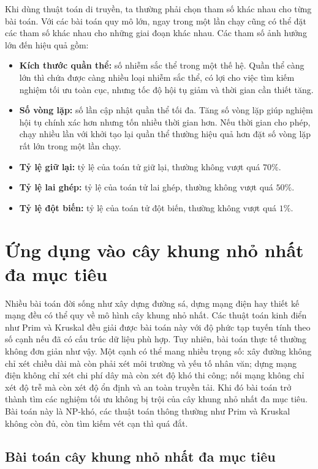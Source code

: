 \documentclass[11pt]{article}
\begin{document}
Khi dùng thuật toán di truyền, ta thường phải chọn tham số khác nhau cho từng
bài toán. Với các bài toán quy mô lớn, ngay trong một lần chạy cũng có thể đặt
các tham số khác nhau cho những giai đoạn khác nhau. Các tham số ảnh hưởng lớn
đến hiệu quả gồm:
\begin{itemize}
  \item \textbf{Kích thước quần thể:} số nhiễm sắc thể trong một thế hệ. Quần
  thể càng lớn thì chứa được càng nhiều loại nhiễm sắc thể, có lợi cho việc
  tìm kiếm nghiệm tối ưu toàn cục, nhưng tốc độ hội tụ giảm và thời gian cần
  thiết tăng.
  \item \textbf{Số vòng lặp:} số lần cập nhật quần thể tối đa. Tăng số vòng
  lặp giúp nghiệm hội tụ chính xác hơn nhưng tốn nhiều thời gian hơn. Nếu thời
  gian cho phép, chạy nhiều lần với khởi tạo lại quần thể thường hiệu quả hơn
  đặt số vòng lặp rất lớn trong một lần chạy.
  \item \textbf{Tỷ lệ giữ lại:} tỷ lệ của toán tử giữ lại, thường không vượt
  quá \(70\%\).
  \item \textbf{Tỷ lệ lai ghép:} tỷ lệ của toán tử lai ghép, thường không vượt
  quá \(50\%\).
  \item \textbf{Tỷ lệ đột biến:} tỷ lệ của toán tử đột biến, thường không vượt
  quá \(1\%\).
\end{itemize}

\section{Ứng dụng vào cây khung nhỏ nhất đa mục tiêu}

Nhiều bài toán đời sống như xây dựng đường sá, dựng mạng điện hay thiết kế
mạng đều có thể quy về mô hình cây khung nhỏ nhất. Các thuật toán kinh điển
như Prim và Kruskal đều giải được bài toán này với độ phức tạp tuyến tính theo
số cạnh nếu đã có cấu trúc dữ liệu phù hợp. Tuy nhiên, bài toán thực tế thường
không đơn giản như vậy. Một cạnh có thể mang nhiều trọng số: xây đường không
chỉ xét chiều dài mà còn phải xét môi trường và yếu tố nhân văn; dựng mạng
điện không chỉ xét chi phí dây mà còn xét độ khó thi công; nối mạng không chỉ
xét độ trễ mà còn xét độ ổn định và an toàn truyền tải. Khi đó bài toán trở
thành tìm các nghiệm tối ưu không bị trội của cây khung nhỏ nhất đa mục tiêu.
Bài toán này là NP-khó, các thuật toán thông thường như Prim và Kruskal không
còn đủ, còn tìm kiếm vét cạn thì quá đắt.

\subsection{Bài toán cây khung nhỏ nhất đa mục tiêu}
\end{document}
